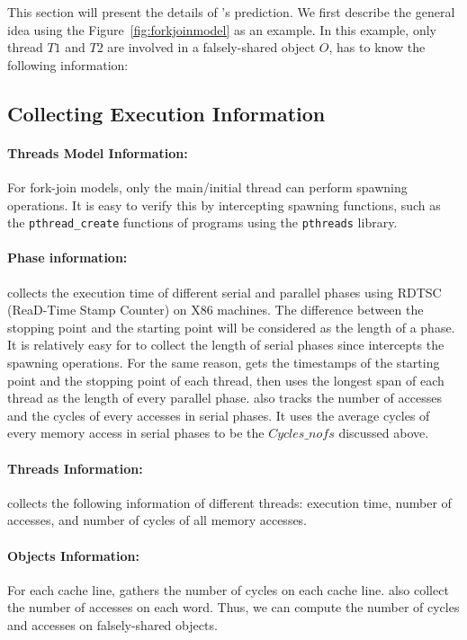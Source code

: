 This section will present the details of \cheetah{}'s prediction. We first describe the general idea using the Figure~\ref{fig:forkjoinmodel} as an example. In this example, only thread $T1$ and $T2$ are involved in a falsely-shared object $O$, \cheetah{} has to know the following information:

 

\subsection{Collecting Execution Information}
\label{sec:getactualtime}

\paragraph{Threads Model Information:} For fork-join models, only the main/initial thread can perform spawning operations. It is easy to verify this by intercepting spawning functions, such as the \texttt{pthread\_create} functions of programs using the \texttt{pthreads} library. 

\paragraph{Phase information:} \Cheetah{} collects the execution time of different serial and parallel phases using RDTSC (ReaD-Time Stamp Counter) on X86 machines.  The difference between the stopping point and the starting point will be considered as the length of a phase. It is relatively easy for \cheetah{} to collect the length of serial phases since \cheetah{} intercepts the spawning operations. For the same reason, \cheetah{} gets the timestamps of the starting point and the stopping point of each thread, then uses the longest span of each thread as the length of every parallel phase. \Cheetah{} also tracks the number of accesses and the cycles of every accesses in serial phases. It uses the average cycles of every memory access in serial phases to be the $Cycles\_{nofs}$ discussed above.  
 
\paragraph{Threads Information:} \Cheetah{} collects the following information of different threads: execution time, number of accesses, and number of cycles of all memory accesses. 

\paragraph{Objects Information:}
For each cache line, \cheetah{} gathers the number of cycles on each cache line. \cheetah{} also collect the number of accesses on each word. Thus, we can compute the number of cycles and accesses on falsely-shared objects. 
 

